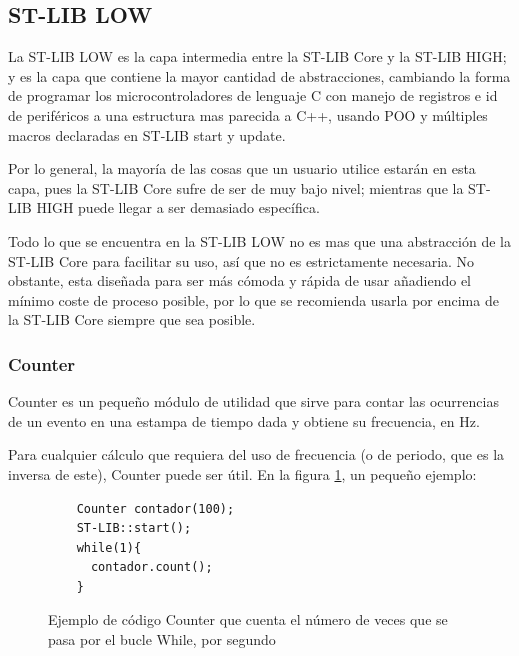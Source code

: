 \documentclass{report}
\begin{document}
\subsection{ST-LIB LOW}
La ST-LIB LOW es la capa intermedia entre la ST-LIB Core y la ST-LIB HIGH; y es la capa que contiene la mayor cantidad de abstracciones, cambiando la forma de programar los microcontroladores de lenguaje C con manejo de registros e id de periféricos a una estructura mas parecida a C++, usando POO y múltiples macros declaradas en ST-LIB start y update. 
\par \vspace{0.3cm}
Por lo general, la mayoría de las cosas que un usuario utilice estarán en esta capa, pues la ST-LIB Core sufre de ser de muy bajo nivel; mientras que la ST-LIB HIGH puede llegar a ser demasiado específica. 
\par \vspace{0.3cm}
Todo lo que se encuentra en la ST-LIB LOW no es mas que una abstracción de la ST-LIB Core para facilitar su uso, así que no es estrictamente necesaria. No obstante, esta diseñada para ser más cómoda y rápida de usar añadiendo el mínimo coste de proceso posible, por lo que se recomienda usarla por encima de la ST-LIB Core siempre que sea posible.

\subsubsection{Counter}
Counter es un pequeño módulo de utilidad que sirve para contar las ocurrencias de un evento en una estampa de tiempo dada y obtiene su frecuencia, en Hz. 
\par \vspace{0.3cm}
Para cualquier cálculo que requiera del uso de frecuencia (o de periodo, que es la inversa de este), Counter puede ser útil. En la figura \ref{CounterCode}, un pequeño ejemplo: 
\begin{figure}[H]
  \begin{lstlisting}
    Counter contador(100);
    ST-LIB::start();
    while(1){
      contador.count();
    }
  \end{lstlisting}
  \caption{Ejemplo de código Counter que cuenta el número de veces que se pasa por el bucle While, por segundo}
  \label{CounterCode}
\end{figure}
\par \vspace{0.3cm}
\end{document}

